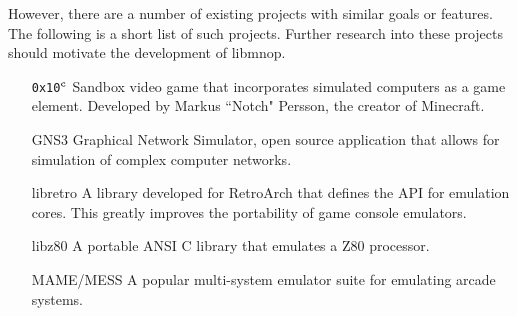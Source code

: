 \documentclass[12pt]{article}
\begin{document}
However, there are a number of existing projects with similar goals or features. The following is a short list of such projects. Further research into these projects should motivate the development of libmnop.
\begin{itemize}
\item[{\tt 0x10}$^\textrm{{\tt c}}$] Sandbox video game that incorporates simulated computers as a game element. Developed by Markus ``Notch" Persson, the creator of Minecraft.
\item[GNS3] Graphical Network Simulator, open source application that allows for simulation of complex computer networks.
\item[libretro] A library developed for RetroArch that defines the API for emulation cores. This greatly improves the portability of game console emulators.
\item[libz80] A portable ANSI C library that emulates a Z80 processor.
\item[MAME/MESS] A popular multi-system emulator suite for emulating arcade systems.
\end{itemize}
\end{document}
